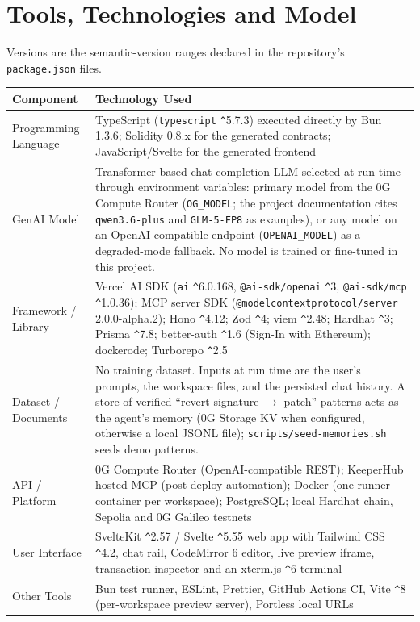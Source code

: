 \documentclass[11pt,letterpaper]{article}
\begin{document}
\section{Tools, Technologies and Model}
Versions are the semantic-version ranges declared in the repository's \texttt{package.json} files.

\medskip
\begin{tabular}{|L{1.9in}|L{4.25in}|}
\hline
\textbf{Component} & \textbf{Technology Used}\\\hline
Programming Language & TypeScript (\texttt{typescript} \texttt{\^{}}5.7.3) executed directly by Bun 1.3.6; Solidity 0.8.x \cite{solidity} for the generated contracts; JavaScript/Svelte for the generated frontend\\\hline
GenAI Model & Transformer-based \cite{vaswani2017attention} chat-completion LLM selected at run time through environment variables: primary model from the 0G Compute Router (\texttt{OG\_MODEL}; the project documentation cites \texttt{qwen3.6-plus} and \texttt{GLM-5-FP8} as examples), or any model on an OpenAI-compatible endpoint (\texttt{OPENAI\_MODEL}) as a degraded-mode fallback. No model is trained or fine-tuned in this project.\\\hline
Framework / Library & Vercel AI SDK \cite{aisdk} (\texttt{ai} \texttt{\^{}}6.0.168, \texttt{@ai-sdk/openai} \texttt{\^{}}3, \texttt{@ai-sdk/mcp} \texttt{\^{}}1.0.36); MCP server SDK (\texttt{@modelcontextprotocol/server} 2.0.0-alpha.2); Hono \texttt{\^{}}4.12; Zod \texttt{\^{}}4; viem \texttt{\^{}}2.48; Hardhat \cite{hardhat} \texttt{\^{}}3; Prisma \texttt{\^{}}7.8; better-auth \texttt{\^{}}1.6 (Sign-In with Ethereum); dockerode; Turborepo \texttt{\^{}}2.5\\\hline
Dataset / Documents & No training dataset. Inputs at run time are the user's prompts, the workspace files, and the persisted chat history. A store of verified ``revert signature $\rightarrow$ patch'' patterns acts as the agent's memory (0G Storage KV when configured, otherwise a local JSONL file); \texttt{scripts/seed-memories.sh} seeds demo patterns.\\\hline
API / Platform & 0G Compute Router \cite{ogrouter} (OpenAI-compatible REST); KeeperHub hosted MCP (post-deploy automation); Docker (one runner container per workspace); PostgreSQL; local Hardhat chain, Sepolia and 0G Galileo testnets\\\hline
User Interface & SvelteKit \texttt{\^{}}2.57 / Svelte \texttt{\^{}}5.55 web app with Tailwind CSS \texttt{\^{}}4.2, chat rail, CodeMirror 6 editor, live preview iframe, transaction inspector and an xterm.js \texttt{\^{}}6 terminal\\\hline
Other Tools & Bun test runner, ESLint, Prettier, GitHub Actions CI, Vite \texttt{\^{}}8 (per-workspace preview server), Portless local URLs\\\hline
\end{tabular}
\end{document}
